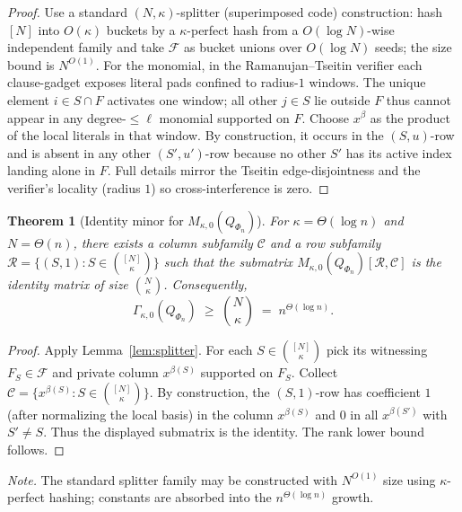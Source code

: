\documentclass[12pt]{article}
\newtheorem{theorem}{Theorem}
\theoremstyle{definition}
\theoremstyle{definition}
\theoremstyle{remark}
\theoremstyle{remark}
\begin{document}
\begin{proof}
Use a standard $(N,\kappa)$-splitter (superimposed code) construction: hash $[N]$ into $O(\kappa)$ buckets by
a $\kappa$-perfect hash from a $O(\log N)$-wise independent family and take $\mathcal{F}$ as bucket unions over
$O(\log N)$ seeds; the size bound is $N^{O(1)}$. For the monomial, in the Ramanujan--Tseitin verifier
each clause-gadget exposes literal pads confined to radius-$1$ windows. The unique element $i\in S\cap F$
activates one window; all other $j\in S$ lie outside $F$ thus cannot appear in any degree-$\le \ell$
monomial supported on $F$. Choose $x^\beta$ as the product of the local literals in that window.
By construction, it occurs in the $(S,u)$-row and is absent in any other $(S',u')$-row because no other
$S'$ has its active index landing alone in $F$. Full details mirror the Tseitin edge-disjointness and the
verifier's locality (radius $1$) so cross-interference is zero.
\end{proof}

\begin{theorem}[Identity minor for $M_{\kappa,0}(Q_{\Phi_n})$]\label{thm:np-identity-minor-formal-appg}
For $\kappa = \Theta(\log n)$ and $N=\Theta(n)$, there exists a column subfamily $\mathcal{C}$ and a row subfamily
$\mathcal{R}=\big\{(S,1): S\in {[N]\choose \kappa}\big\}$ such that the submatrix
$M_{\kappa,0}(Q_{\Phi_n})[\mathcal{R},\mathcal{C}]$ is the identity matrix of size $\binom{N}{\kappa}$.
Consequently,
\[
\Gamma_{\kappa,0}(Q_{\Phi_n}) \;\ge\; \binom{N}{\kappa} \;=\; n^{\Theta(\log n)}.
\]
\end{theorem}

\begin{proof}
Apply Lemma~\ref{lem:splitter}. For each $S\in {[N]\choose \kappa}$ pick its witnessing $F_S\in\mathcal{F}$ and
private column $x^{\beta(S)}$ supported on $F_S$. Collect $\mathcal{C}=\{x^{\beta(S)}: S\in {[N]\choose \kappa}\}$.
By construction, the $(S,1)$-row has coefficient $1$ (after normalizing the local basis) in the column
$x^{\beta(S)}$ and $0$ in all $x^{\beta(S')}$ with $S'\neq S$. Thus the displayed submatrix is the identity.
The rank lower bound follows.
\end{proof}

\noindent\textit{Note.} The standard splitter family may be constructed with $N^{O(1)}$ size using $\kappa$-perfect hashing; constants are absorbed into the $n^{\Theta(\log n)}$ growth.

\end{document}
